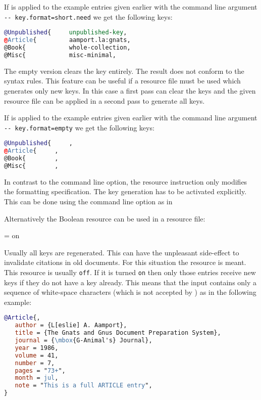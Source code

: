 \documentclass[11pt,a4paper]{scrbook}
\begin{document}
\begin{description}
  If \BibTool{} is applied to the example entries given earlier with the
  command line argument \verb|-- key.format=short.need| we get the following
  keys:
\begin{lstlisting}[language=BibTeX]
@Unpublished{     unpublished-key,
@Article{         aamport.la:gnats,
@Book{            whole-collection,
@Misc{            misc-minimal,
\end{lstlisting}

\item [\rsc{empty}]
  The empty version clears the key entirely. The result does not conform to
  the \BibTeX{} syntax rules. This feature can be useful if a resource file
  must be used which generates only new keys. In this case a first pass can
  clear the keys and the given resource file can be applied in a second pass
  to generate all keys.

  If \BibTool{} is applied to the example entries given earlier with the
  command line argument \verb|-- key.format=empty| we get the following
  keys:
\begin{lstlisting}[language=BibTeX]
@Unpublished{	  ,
@Article{	  ,
@Book{		  ,
@Misc{		  ,
\end{lstlisting}
\end{description}

In contrast to the command line option, the resource instruction only modifies
the formatting specification. The key generation has to be activated
explicitly. This can be done using the command line option  as in

\sh[F]{}

Alternatively the Boolean resource  can be used in a
resource file:

\begin{Resources}
   = on
\end{Resources}

Usually all keys are regenerated. This can have the unpleasant side-effect to
invalidate citations in old documents. For this situation the resource
 is meant. This resource is usually \verb|off|. If it is
turned \verb|on| then only those entries receive new keys if they do not have
a key already. This means that the input contains only a sequence of
white-space characters (which is not accepted by \BibTeX) as in the following
example:

\begin{lstlisting}[language=BibTeX]
@Article{,
   author = {L[eslie] A. Aamport},
   title = {The Gnats and Gnus Document Preparation System},
   journal = {\mbox{G-Animal's} Journal},
   year = 1986,
   volume = 41,
   number = 7,
   pages = "73+",
   month = jul,
   note = "This is a full ARTICLE entry",
}
\end{lstlisting}
    
\end{document}

